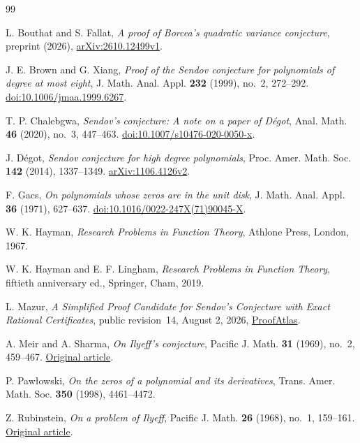 \documentclass[11pt,reqno]{amsart}
\numberwithin{equation}{section}
\theoremstyle{definition}
\theoremstyle{remark}
\begin{document}
\begin{thebibliography}{99}

L. Bouthat and S. Fallat, \emph{A proof of Borcea's quadratic variance
conjecture}, preprint (2026), \href{https://arxiv.org/abs/2610.12499v1}{arXiv:2610.12499v1}.

J. E. Brown and G. Xiang, \emph{Proof of the Sendov conjecture for
polynomials of degree at most eight}, J. Math. Anal. Appl.
\textbf{232} (1999), no.~2, 272--292.
\href{https://doi.org/10.1006/jmaa.1999.6267}{doi:10.1006/jmaa.1999.6267}.

T. P. Chalebgwa, \emph{Sendov's conjecture: A note on a paper of
D\'egot}, Anal. Math. \textbf{46} (2020), no.~3, 447--463.
\href{https://doi.org/10.1007/s10476-020-0050-x}{doi:10.1007/s10476-020-0050-x}.

J. D\'egot, \emph{Sendov conjecture for high degree polynomials},
Proc. Amer. Math. Soc. \textbf{142} (2014), 1337--1349.
\href{https://arxiv.org/abs/1106.4126v2}{arXiv:1106.4126v2}.

F. Gacs, \emph{On polynomials whose zeros are in the unit disk},
J. Math. Anal. Appl. \textbf{36} (1971), 627--637.
\href{https://doi.org/10.1016/0022-247X(71)90045-X}{doi:10.1016/0022-247X(71)90045-X}.

W. K. Hayman, \emph{Research Problems in Function Theory},
Athlone Press, London, 1967.

W. K. Hayman and E. F. Lingham, \emph{Research Problems in Function
Theory}, fiftieth anniversary ed., Springer, Cham, 2019.

L. Mazur, \emph{A Simplified Proof Candidate for Sendov's Conjecture
with Exact Rational Certificates}, public revision~14, August 2, 2026,
\href{https://www.proofatlas.ai/research/sendov-conjecture-proof-candidate/}{ProofAtlas}.

A. Meir and A. Sharma, \emph{On Ilyeff's conjecture},
Pacific J. Math. \textbf{31} (1969), no.~2, 459--467.
\href{https://msp.org/pjm/1969/31-2/pjm-v31-n2-p20-s.pdf}{Original article}.

P. Paw{\l}owski, \emph{On the zeros of a polynomial and its derivatives},
Trans. Amer. Math. Soc. \textbf{350} (1998), 4461--4472.

Z. Rubinstein, \emph{On a problem of Ilyeff}, Pacific J. Math.
\textbf{26} (1968), no.~1, 159--161.
\href{https://msp.org/pjm/1968/26-1/pjm-v26-n1-p18-s.pdf}{Original article}.


\end{thebibliography}
\end{document}
